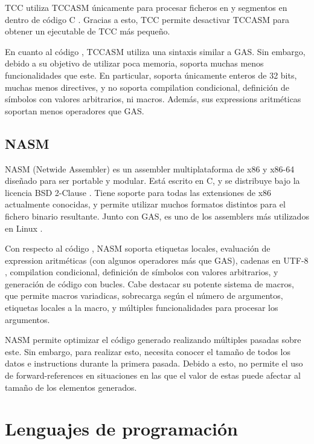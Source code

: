 TCC utiliza TCCASM únicamente para procesar ficheros en
 y segmentos en 
dentro de código C \parencite{tcc-manual}. Gracias a esto, TCC permite
desactivar TCCASM para obtener un ejecutable de TCC más pequeño.

En cuanto al código , TCCASM utiliza una sintaxis
similar a GAS. Sin embargo, debido a su objetivo de utilizar poca memoria,
soporta muchas menos funcionalidades que este. En particular, soporta únicamente
enteros de 32 bits, muchas menos \glspl{directive}, y no soporta
\gls{compilation} condicional, definición de símbolos con valores arbitrarios,
ni macros. Además, sus \glspl{expression} aritméticas soportan menos operadores
que GAS.

\subsection{NASM}

NASM (Netwide Assembler) \parencite{NASM} es un \gls{assembler} multiplataforma
de x86 y x86-64 diseñado para ser portable y modular. Está escrito en C, y se
distribuye bajo la licencia BSD 2-Clause \parencite{bsd-2c}. Tiene soporte para
todas las extensiones de x86 actualmente conocidas, y permite utilizar muchos
formatos distintos para el fichero binario resultante. Junto con GAS, es uno de
los \glspl{assembler} más utilizados en Linux \parencite{assembler-usage}.

Con respecto al código , NASM soporta etiquetas
locales, evaluación de \gls{expression} aritméticas (con algunos operadores más
que GAS), cadenas en UTF-8 \parencite{UTF-8}, \gls{compilation} condicional,
definición de símbolos con valores arbitrarios, y generación de código con
bucles. Cabe destacar su potente sistema de macros, que permite macros
variadicas, sobrecarga según el número de argumentos, etiquetas locales a la
macro, y múltiples funcionalidades para procesar los argumentos.

NASM permite optimizar el código generado realizando múltiples pasadas sobre
este. Sin embargo, para realizar esto, necesita conocer el tamaño de todos los
datos e \glspl{instruction} durante la primera pasada. Debido a esto, no permite
el uso de \glspl{forward-reference} en situaciones en las que el valor de estas
puede afectar al tamaño de los elementos generados. \parencite{NASM-manual}

\section{Lenguajes de programación}

